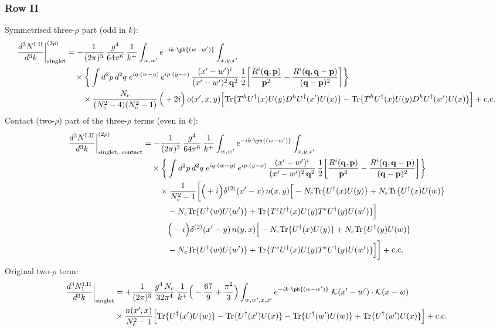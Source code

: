 \subsubsection*{Row II}
Symmetrised three-$\rho$ part (odd in $k$):
\begin{align}
\frac{d^{3}N^{\rm I.II}}{d^{3}k}\bigg|^{(3\rho)}_{\rm singlet}&=-\frac{1}{(2\pi)^{3}}\,\frac{g^{4}}{64\pi^{6}}\,\frac{1}{k^{+}}\int_{w,w'}e^{-ik\cdot\ph{(w-w')}}\int_{x,y,x'}\notag\\
&\quad\times\bigg\{\int d^{2}p\,d^{2}q\;e^{iq\cdot(w-y)}\,e^{ip\cdot(y-x)}\,\frac{(x'-w')^{i}}{(x'-w')^{2}\,\mathbf{q}^{2}}\,\frac{1}{2}\bigg[\frac{R^{i}(\mathbf{q},\mathbf{p})}{\mathbf{p}^{2}}-\frac{R^{i}(\mathbf{q},\mathbf{q}-\mathbf{p})}{(\mathbf{q}-\mathbf{p})^{2}}\bigg]\bigg\}\notag\\
&\qquad\times \frac{N_{c}}{(N_{c}^{2}-4)(N_{c}^{2}-1)}\,\Big(+2i\Big)\,o(x',x,y)\Big[{\rm Tr}\{T^{h}U^{\dagger}(x)U(y)D^{h}U^{\dagger}(x')U(x)\}-{\rm Tr}\{T^{h}U^{\dagger}(x)U(y)D^{h}U^{\dagger}(w')U(x)\}\Big]+{\rm c.c.}\label{eq:E-I.II-3}
\end{align}
Contact (two-$\rho$) part of the three-$\rho$ terms (even in $k$):
\begin{align}
\frac{d^{3}N^{\rm I.II}}{d^{3}k}\bigg|^{(2\rho)}_{\rm singlet,\ contact}&=-\frac{1}{(2\pi)^{3}}\,\frac{g^{4}}{64\pi^{6}}\,\frac{1}{k^{+}}\int_{w,w'}e^{-ik\cdot\ph{(w-w')}}\int_{x,y,x'}\notag\\
&\quad\times\bigg\{\int d^{2}p\,d^{2}q\;e^{iq\cdot(w-y)}\,e^{ip\cdot(y-x)}\,\frac{(x'-w')^{i}}{(x'-w')^{2}\,\mathbf{q}^{2}}\,\frac{1}{2}\bigg[\frac{R^{i}(\mathbf{q},\mathbf{p})}{\mathbf{p}^{2}}-\frac{R^{i}(\mathbf{q},\mathbf{q}-\mathbf{p})}{(\mathbf{q}-\mathbf{p})^{2}}\bigg]\bigg\}\notag\\
&\qquad\times \frac{1}{N_{c}^{2}-1}\bigg[\Big(+i\Big)\delta^{(2)}(x'-x)\,n(x,y)\Big[-N_{c}{\rm Tr}\{U^{\dagger}(x)U(y)\}+N_{c}{\rm Tr}\{U^{\dagger}(x)U(w)\}\notag\\
&\qquad\quad -N_{c}{\rm Tr}\{U^{\dagger}(w)U(w')\}+{\rm Tr}\{T^{e}U^{\dagger}(x)U(y)T^{e}U^{\dagger}(y)U(w')\}\Big]\notag\\
&\qquad\quad \Big(-i\Big)\delta^{(2)}(x'-y)\,n(y,x)\Big[-N_{c}{\rm Tr}\{U^{\dagger}(x)U(y)\}+N_{c}{\rm Tr}\{U^{\dagger}(y)U(w)\}\notag\\
&\qquad\quad -N_{c}{\rm Tr}\{U^{\dagger}(w)U(w')\}+{\rm Tr}\{T^{e}U^{\dagger}(x)U(y)T^{e}U^{\dagger}(y)U(w')\}\Big]\bigg]+{\rm c.c.}\label{eq:E-I.II-2}
\end{align}
Original two-$\rho$ term:
\begin{align}
\frac{d^{3}N^{\rm I.II}_{1}}{d^{3}k}\bigg|_{\rm singlet} & = +\frac{1}{(2\pi)^{3}}\,\frac{g^{4}\,N_{c}}{32\pi^{4}}\,\frac{1}{k^{+}}\Big(-\frac{67}{9}+\frac{\pi^{2}}{3}\Big)\int_{w,w',x,x'} e^{-ik\cdot\ph{(w-w')}}\;\mathcal{K}(x'-w')\cdot\mathcal{K}(x-w)\notag \\
& \times\frac{n(x',x)}{N_{c}^{2}-1}\Big[{\rm Tr}\{U^{\dagger}(x')U(w)\}-{\rm Tr}\{U^{\dagger}(x')U(x)\}-{\rm Tr}\{U^{\dagger}(w')U(w)\}+{\rm Tr}\{U^{\dagger}(w')U(x)\}\Big]+{\rm c.c.}\label{eq:E-I.II-2o}
\end{align}
